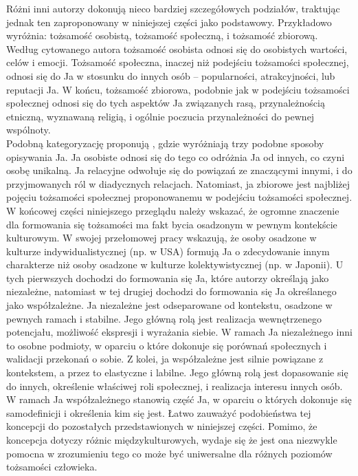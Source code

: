 \documentclass[man]{apa6}
\begin{document}
Różni inni autorzy dokonują nieco bardziej szczegółowych podziałów, traktując jednak ten zaproponowany w niniejszej części jako podstawowy. Przykładowo \textcite{cheek1989identity} wyróżnia: tożsamość osobistą, tożsamość społeczną, i tożsamość zbiorową. Według cytowanego autora tożsamość osobista odnosi się do osobistych wartości, celów i emocji. Tożsamość społeczna, inaczej niż podejściu tożsamości społecznej, odnosi się do Ja w stosunku do innych osób -- popularności, atrakcyjności, lub reputacji Ja. W końcu, tożsamość zbiorowa, podobnie jak w podejściu tożsamości społecznej odnosi się do tych aspektów Ja związanych rasą, przynależnością etniczną, wyznawaną religią, i ogólnie poczucia przynależności do pewnej wspólnoty.\\

Podobną kategoryzację proponują \textcite{brewer1996we}, gdzie wyróżniają trzy podobne sposoby opisywania Ja. Ja osobiste odnosi się do tego co odróżnia Ja od innych, co czyni osobę unikalną. Ja relacyjne odwołuje się do powiązań ze znaczącymi innymi, i do przyjmowanych ról w diadycznych relacjach. Natomiast, ja zbiorowe jest najbliżej pojęciu tożsamości społecznej proponowanemu w podejściu tożsamości społecznej.\\

W końcowej części niniejszego przeglądu należy wskazać, że ogromne znaczenie dla formowania się tożsamości ma fakt bycia osadzonym w pewnym kontekście kulturowym. W swojej przełomowej pracy \textcite{markus1991culture} wskazują, że osoby osadzone w kulturze indywidualistycznej (np. w USA) formują Ja o zdecydowanie innym charakterze niż osoby osadzone w kulturze kolektywistycznej (np. w Japonii). U tych pierwszych dochodzi do formowania się Ja, które autorzy określają jako niezależne, natomiast w tej drugiej dochodzi do formowania się Ja określanego jako współzależne. Ja niezależne jest odseparowane od kontekstu, osadzone w pewnych ramach i stabilne. Jego główną rolą jest realizacja wewnętrzenego potencjału, możliwość ekspresji i wyrażania siebie. W ramach Ja niezależnego inni to osobne podmioty, w oparciu o które dokonuje się porównań społecznych i walidacji przekonań o sobie. Z kolei, ja współzależne jest silnie powiązane z kontekstem, a przez to elastyczne i labilne. Jego główną rolą jest dopasowanie się do innych, określenie właściwej roli społecznej, i realizacja interesu innych osób. W ramach Ja współzależnego stanowią część Ja, w oparciu o których dokonuje się samodefinicji i określenia kim się jest. Łatwo zauważyć podobieństwa tej koncepcji do pozostałych przedstawionych w niniejszej części. Pomimo, że koncepcja \textcite{markus1991culture} dotyczy różnic międzykulturowych, wydaje się że jest ona niezwykle pomocna w zrozumieniu tego co może być uniwersalne dla różnych poziomów tożsamości człowieka.
\end{document}
